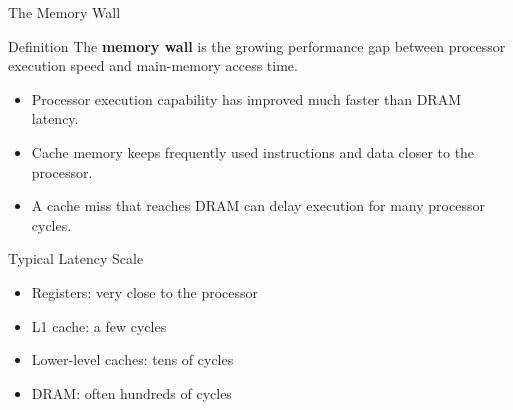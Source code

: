 \documentclass[aspectratio=169,11pt,t]{beamer}
\newcommand{\key}[1]{\textbf{#1}}
\begin{document}

\begin{frame}{The Memory Wall}

\vspace{-0.2cm}

\begin{block}{Definition}
The \key{memory wall} is the growing performance gap between processor
execution speed and main-memory access time.
\end{block}

\vspace{0.1cm}

\begin{itemize}\setlength{\itemsep}{4pt}
  \item Processor execution capability has improved much faster than DRAM latency.
  \item Cache memory keeps frequently used instructions and data closer to the processor.
  \item A cache miss that reaches DRAM can delay execution for many processor cycles.
\end{itemize}

\vspace{0.1cm}

\begin{block}{Typical Latency Scale}
\begin{itemize}\setlength{\itemsep}{1pt}
  \item Registers: very close to the processor
  \item L1 cache: a few cycles
  \item Lower-level caches: tens of cycles
  \item DRAM: often hundreds of cycles
\end{itemize}
\end{block}

\end{frame}





\end{document}
